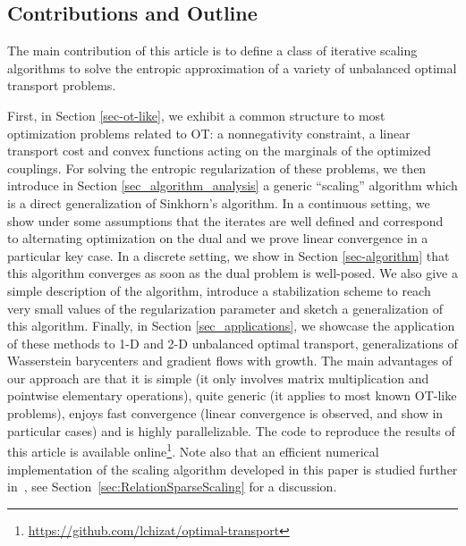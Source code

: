 \subsection{Contributions and Outline}
The main contribution of this article is to define a class of iterative scaling algorithms to solve the entropic approximation of a variety of unbalanced optimal transport problems. 
%
\iffalse
More precisely, these convex optimization schemes can be used to minimize the sum of a linear cost and several other convex functions that depends only on the marginals of the optimized couplings. 
%
This includes as special case classical OT, unbalanced OT, unbalanced barycenters and unbalanced gradient flows. 
%
The main advantages of this approaches are that it is simple (it only involves matrix multiplication and pointwise elementary operations), quite generic (it applies to most known OT-like problems), enjoy fast convergence (linear convergence is observed, and known to hold for classical OT), is highly parallelisable, and can benefit from special structure of the domain (such as for instance axis-separability on squared regular grid, where iterations are thus one order of magnitude faster).
%
We showcase the application of these methods to color transfer, 2-D shapes deformations and to the dynamics of tumor growth.
\fi
%
First, in Section \ref{sec-ot-like}, we exhibit a common structure to most optimization problems related to OT: a nonnegativity constraint, a linear transport cost and convex functions acting on the marginals of the optimized couplings. 
%
For solving the entropic regularization of these problems, we then introduce in Section \ref{sec_algorithm_analysis} a generic ``scaling'' algorithm which is a direct generalization of Sinkhorn's algorithm. 
%
In a continuous setting, we show under some assumptions that the iterates are well defined and correspond to alternating optimization on the dual and we prove linear convergence in a particular key case. 
%
In a discrete setting, we show in Section \ref{sec-algorithm} that this algorithm converges as soon as the dual problem is well-posed. We also give a simple description of the algorithm, introduce a stabilization scheme to reach very small values of the regularization parameter and sketch a generalization of this algorithm.
%
Finally, in Section \ref{sec_applications}, we showcase the application of these methods to 1-D and 2-D unbalanced optimal transport, generalizations of Wasserstein barycenters and gradient flows with growth.
%
The main advantages of our approach are that it is simple (it only involves matrix multiplication and pointwise elementary operations), quite generic (it applies to most known OT-like problems), enjoys fast convergence (linear convergence is observed, and show in particular cases) and is highly parallelizable.
%
The code to reproduce the results of this article is available online\footnote{\url{https://github.com/lchizat/optimal-transport}}.
%
Note also that an efficient numerical implementation of the scaling algorithm developed in this paper is studied
further in~\cite{SchmitzerScaling2016}, see
Section~\ref{sec:RelationSparseScaling} for a  discussion.


